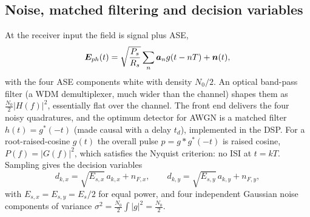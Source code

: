 \subsection{Noise, matched filtering and decision variables}
At the receiver input the field is signal plus ASE,
\begin{equation}
  \bm{E}_{ph}(t)=\sqrt{\frac{P_s}{R_s}}\sum_n\bm{a}_ng(t-nT)+\bm{n}(t),
\end{equation}
with the four ASE components white with density $N_0/2$. An optical band-pass filter (a WDM
demultiplexer, much wider than the channel) shapes them as $\frac{N_0}2|H(f)|^2$, essentially flat over the
channel. The front end delivers the four noisy quadratures, and the optimum detector for AWGN is a
matched filter $h(t)=g^*(-t)$ (made causal with a delay $t_d$), implemented in the DSP. For a
root-raised-cosine $g(t)$ the overall pulse $p=g*g^*(-t)$ is raised cosine, $P(f)=|G(f)|^2$, which
satisfies the Nyquist criterion: no ISI at $t=kT$. Sampling gives the decision variables
\begin{equation}
  d_{k,x}=\sqrt{E_{s,x}}\,a_{k,x}+n_{F,x},\qquad d_{k,y}=\sqrt{E_{s,y}}\,a_{k,y}+n_{F,y},
\end{equation}
with $E_{s,x}=E_{s,y}=E_s/2$ for equal power, and four independent Gaussian noise components of variance
$\sigma^2=\frac{N_0}2\int|g|^2=\frac{N_0}2$.


